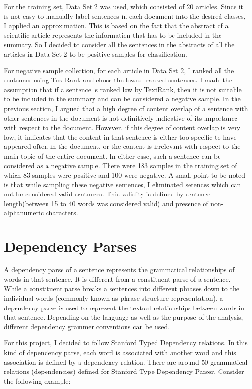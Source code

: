 For the training set, Data Set 2 was used, which consisted of 20 articles.
Since it is not easy to manually label sentences in each document into the desired classes, I applied an approximation.
This is based on the fact that the abstract of a scientific article represents the information that has to be included in the summary.
So I decided to consider all the sentences in the abstracts of all the articles in Data Set 2 to be positive samples for classification.

For negative sample collection, for each article in Data Set 2, I ranked all the sentences using TextRank and chose the lowest ranked sentences.
I made the assumption that if a sentence is ranked low by TextRank, then it is not suitable to be included in the summary and can be considered a negative sample.
In the previous section, I argued that a high degree of content overlap of a sentence with other sentences in the document is not definitively indicative of its importance with respect to the document.
However, if this degree of content overlap is very low, it indicates that the content in that sentence is either too specific to have appeared often in the document, or the content is irrelevant with respect to the main topic of the entire document.
In either case, such a sentence can be considered as a negative sample.
There were 183 samples in the training set of which 83 samples were positive and 100 were negative.
A small point to be noted is that while sampling these negative sentences, I eliminated setences which can not be considered valid sentneces. This validity is defined by sentence length(between 15 to 40 words was considered valid) and presence of non-alphanumeric characters.

\section{Dependency Parses}
A dependency parse of a sentence represents the grammatical relationships of words in that sentence.
It is different from a constituent parse of a sentence.
While a constituent parse breaks a sentences into different phrases down to the individual words (commonly known as phrase structure representation), a dependency parse is used to represent the textual relationships between words in that sentence.
Depending on the language as well as the purpose of the analysis, different dependency grammer conventions can be used.

For this project, I decided to follow Stanford Typed Dependency relations.
In this kind of dependency parse, each word is associated with another word and this association is defined by a dependency relation.
There are around 50 grammatical relations (dependencies) defined for Stanford Type Dependency Parser.
Consider the following example:

